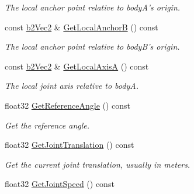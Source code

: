 \begin{DoxyCompactItemize}
\begin{DoxyCompactList}\small\item\em The local anchor point relative to body\-A's origin. \end{DoxyCompactList}\item 
\hypertarget{classb2_prismatic_joint_a5591358eced21a8845744a8c47b7df9d}{const \hyperlink{structb2_vec2}{b2\-Vec2} \& \hyperlink{classb2_prismatic_joint_a5591358eced21a8845744a8c47b7df9d}{Get\-Local\-Anchor\-B} () const }\label{classb2_prismatic_joint_a5591358eced21a8845744a8c47b7df9d}

\begin{DoxyCompactList}\small\item\em The local anchor point relative to body\-B's origin. \end{DoxyCompactList}\item 
\hypertarget{classb2_prismatic_joint_ab1aff69853c5ddb89ed8efdf8a0f4376}{const \hyperlink{structb2_vec2}{b2\-Vec2} \& \hyperlink{classb2_prismatic_joint_ab1aff69853c5ddb89ed8efdf8a0f4376}{Get\-Local\-Axis\-A} () const }\label{classb2_prismatic_joint_ab1aff69853c5ddb89ed8efdf8a0f4376}

\begin{DoxyCompactList}\small\item\em The local joint axis relative to body\-A. \end{DoxyCompactList}\item 
\hypertarget{classb2_prismatic_joint_ae9e0a48367f191b2dd6a5bc05364a372}{float32 \hyperlink{classb2_prismatic_joint_ae9e0a48367f191b2dd6a5bc05364a372}{Get\-Reference\-Angle} () const }\label{classb2_prismatic_joint_ae9e0a48367f191b2dd6a5bc05364a372}

\begin{DoxyCompactList}\small\item\em Get the reference angle. \end{DoxyCompactList}\item 
\hypertarget{classb2_prismatic_joint_ade994ac79315258c80bccceef371df57}{float32 \hyperlink{classb2_prismatic_joint_ade994ac79315258c80bccceef371df57}{Get\-Joint\-Translation} () const }\label{classb2_prismatic_joint_ade994ac79315258c80bccceef371df57}

\begin{DoxyCompactList}\small\item\em Get the current joint translation, usually in meters. \end{DoxyCompactList}\item 
\hypertarget{classb2_prismatic_joint_a221aa1c6253686c96a02ecdd99c84b4c}{float32 \hyperlink{classb2_prismatic_joint_a221aa1c6253686c96a02ecdd99c84b4c}{Get\-Joint\-Speed} () const }\label{classb2_prismatic_joint_a221aa1c6253686c96a02ecdd99c84b4c}


\end{DoxyCompactItemize}
